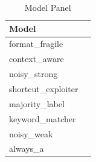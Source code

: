 \begin{table}[t]
\centering
\caption{Model Panel}
\begin{tabular}{ll}
\toprule
Model \\
\midrule
format\_fragile \\
context\_aware \\
noisy\_strong \\
shortcut\_exploiter \\
majority\_label \\
keyword\_matcher \\
noisy\_weak \\
always\_a \\
\bottomrule
\end{tabular}
\end{table}
